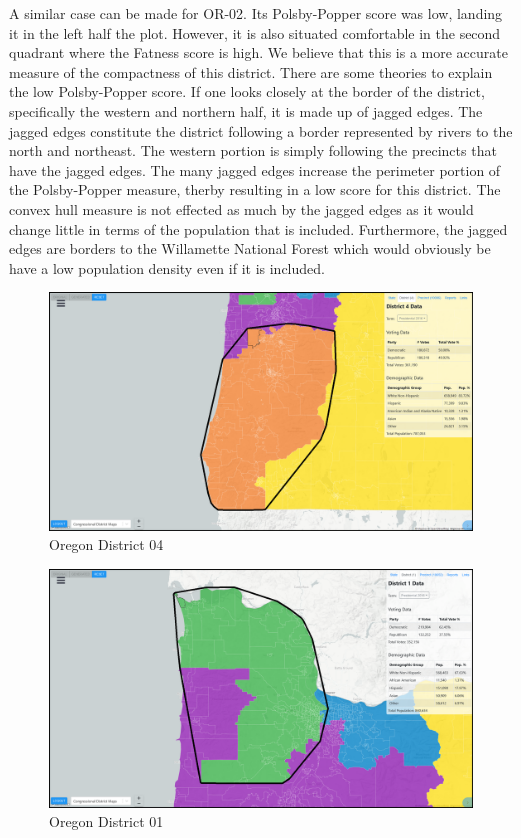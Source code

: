 \documentclass[letterpaper]{article}
\begin{document}
A similar case can be made for OR-02. Its Polsby-Popper score was low, landing it in the left half the plot. However, it is also situated comfortable in the second quadrant where the Fatness score is high. We believe that this is a more accurate measure of the compactness of this district. There are some theories to explain the low Polsby-Popper score. If one looks closely at the border of the district, specifically the western and northern half, it is made up of jagged edges. The jagged edges constitute the district following a border represented by rivers to the north and northeast. The western portion is simply following the precincts that have the jagged edges. The many jagged edges increase the perimeter portion of the Polsby-Popper measure, therby resulting in a low score for this district. The convex hull measure is not effected as much by the jagged edges as it would change little in terms of the population that is included. Furthermore, the jagged edges are borders to the Willamette National Forest which would obviously be have a low population density even if it is included.

\begin{figure}[H]
	\includegraphics[width=\linewidth]{./figures/OR-04-ConvexHull.png}
	\caption{Oregon District 04}
	\label{fig:or04ch}
\end{figure}

\begin{figure}[H]
	\includegraphics[width=\linewidth]{./figures/OR-01-ConvexHull.png}
	\caption{Oregon District 01}
	\label{fig:or01ch}
\end{figure}
\end{document}
